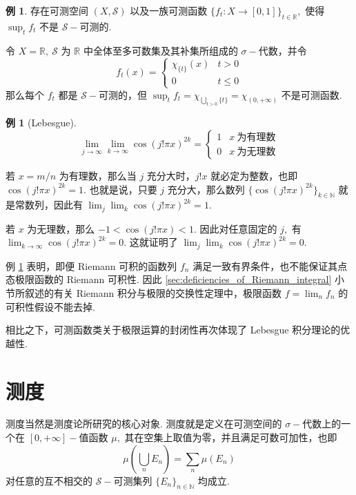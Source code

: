 \documentclass[12pt, a4paper, oneside]{book}
\numberwithin{figure}{section}
\theoremstyle{definition}
\newtheorem{example}[theorem]{例}
\begin{document}
\begin{example}
    存在可测空间 $(X,\mathcal S)$ 以及一族可测函数 $\{f_t:X\to [0,1]\}_{t\in\mathbb R},$ 使得 $\sup_t f_t$ 不是 $\mathcal S-$可测的.
\end{example}

令 $X=\mathbb R,\ \mathcal S$ 为 $\mathbb R$ 中全体至多可数集及其补集所组成的 $\sigma-$代数，并令 
\begin{equation}
    f_t(x) = \begin{cases}
        \chi_{\{t\}}(x)&t>0\\
        0&t\leq 0
    \end{cases}
\end{equation}
那么每个 $f_t$ 都是 $\mathcal S-$可测的，但 $\sup_t f_t=\chi_{\bigcup_{t>0}\{t\}}=\chi_{(0,+\infty)}$ 不是可测函数.

\begin{example}[Lebesgue]\label{ex:limit_of_Riemann_integrable_function_can_be_not_integrable}
    \begin{equation}
        \lim_{j\to\infty}\lim_{k\to\infty}\cos(j!\pi x)^{2k} = \begin{cases}
            1&x\ \text{为有理数}\\
            0&x\ \text{为无理数}
        \end{cases}
    \end{equation}
\end{example}
若 $x=m/n$ 为有理数，那么当 $j$ 充分大时，$j!x$ 就必定为整数，也即 $\cos(j!\pi x)^{2k}=1.$ 也就是说，只要 $j$ 充分大，那么数列 $\{\cos(j!\pi x)^{2k}\}_{k\in\mathbb N}$ 就是常数列，因此有 
$\lim_j\lim_k \cos(j!\pi x)^{2k}=1.$ 

若 $x$ 为无理数，那么 $-1<\cos(j!\pi x)<1.$ 因此对任意固定的 $j,$ 有 $\lim_{k\to\infty}\cos(j!\pi x)^{2k}=0.$ 这就证明了 $\lim_{j}\lim_{k}\cos(j!\pi x)^{2k}=0.$ 

例 \ref{ex:limit_of_Riemann_integrable_function_can_be_not_integrable} 表明，即便 Riemann 可积的函数列 $f_n$ 满足一致有界条件，也不能保证其点态极限函数的 Riemann 可积性. 
因此 \ref{sec:deficiencies_of_Riemann_integral} 小节所叙述的有关 Riemann 积分与极限的交换性定理中，极限函数 $f=\lim_n f_n$ 的可积性假设不能去掉. 

相比之下，可测函数类关于极限运算的封闭性再次体现了 Lebesgue 积分理论的优越性.


\section{测度} 
测度当然是测度论所研究的核心对象. 测度就是定义在可测空间的 $\sigma-$代数上的一个在 $[0,+\infty]-$值函数 $\mu,$ 其在空集上取值为零，并且满足可数可加性，也即
\begin{equation}
    \mu\left(\bigcup_n E_n\right)=\sum_n \mu(E_n)
\end{equation}
对任意的互不相交的 $\mathcal S-$可测集列 $\{E_n\}_{n\in\mathbb N}$ 均成立.
\end{document}
